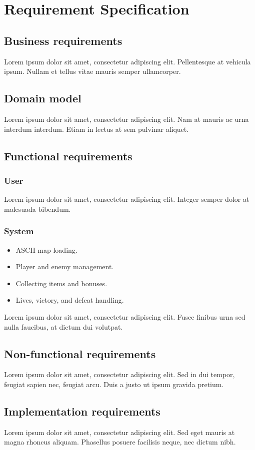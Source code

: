 \chapter{Requirement Specification}

\section{Business requirements}
Lorem ipsum dolor sit amet, consectetur adipiscing elit. Pellentesque at
vehicula ipsum. Nullam et tellus vitae mauris semper ullamcorper.

\section{Domain model}
Lorem ipsum dolor sit amet, consectetur adipiscing elit. Nam at mauris ac urna
interdum interdum. Etiam in lectus at sem pulvinar aliquet.

\section{Functional requirements}

\subsection{User}
Lorem ipsum dolor sit amet, consectetur adipiscing elit. Integer semper dolor
at malesuada bibendum.

\subsection{System}
\begin{itemize}[leftmargin=*]
  \item ASCII map loading.
  \item Player and enemy management.
  \item Collecting items and bonuses.
  \item Lives, victory, and defeat handling.
\end{itemize}
Lorem ipsum dolor sit amet, consectetur adipiscing elit. Fusce finibus urna
sed nulla faucibus, at dictum dui volutpat.

\section{Non-functional requirements}
Lorem ipsum dolor sit amet, consectetur adipiscing elit. Sed in dui tempor,
feugiat sapien nec, feugiat arcu. Duis a justo ut ipsum gravida pretium.

\section{Implementation requirements}
Lorem ipsum dolor sit amet, consectetur adipiscing elit. Sed eget mauris at
magna rhoncus aliquam. Phasellus posuere facilisis neque, nec dictum nibh.
